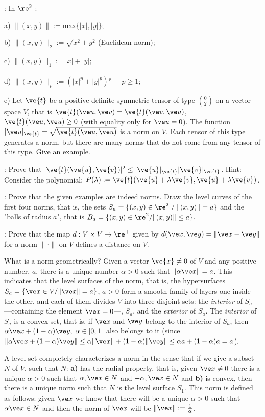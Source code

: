 \noi{}: In $\re^2$ :

\noi a) $\|(x,y)\|:= \text{max}\{|x|,|y|\}$;

\noi b) $\|(x,y)\|_{2}:=\sqrt{x^2+y^2}$ (Euclidean norm);

\noi c) $\|(x,y)\|_{1}:=|x| +|y|$;

\noi d) $\|(x,y)\|_{p}:=(|x|^{p} + |y|^{p})^{\frac{1}{p}} \;\;\;\;\; p\geq 1$;

\noi e) Let $\ve{t}$ be a positive-definite symmetric tensor of type ${0 \choose 2}$ on a vector space $V$, that is 
$\ve{t}(\ve u,\ve v)=\ve{t}(\ve v,\ve u)$, $\ve{t}(\ve u,\ve u)\geq 0$ (with equality only for $\ve u=0$). 
The function $|\ve u|_{\ve{t}} =\sqrt{\ve{t}(\ve u,\ve u)}$ is a norm on $V$. 
Each tensor of this type generates a norm, but there are many norms that do not come from any tensor of 
this type. Give an example.

\ejer: Prove that $|\ve{t}(\ve{u},\ve{v})|^2 \leq |\ve{u}|_{\ve{t}} |\ve{v}|_{\ve{t}}$. 
Hint: Consider the polynomial: $P(\lambda) := \ve{t}(\ve{u} + \lambda \ve{v},\ve{u} + \lambda \ve{v})$.

\ejer: Prove that the given examples are indeed norms. Draw the level curves of the first four norms, that is, 
the sets $S_a=\{(x,y)\in \re^2\;/\; \|(x,y)\|=a\}$ and the "balls of radius $a$", that is $B_a=\{(x,y)\in \re^2/\|(x,y)\|\leq a\}$.

\ejer: Prove that the map $d:V\times V \to \re^+$ given by $d(\ve x,\ve y) = \|\ve x-\ve y\|$ for a norm $\|\cdot\|$ on $V$ defines a distance on $V$.

What is a norm geometrically? Given a vector $\ve{x}\neq 0$ of $V$ and any positive number, $a$, there is a unique number $\alpha > 0$ such that 
$\|\alpha \ve x\|=a$. This indicates that the level surfaces of the norm, that is, the hypersurfaces 
$S_a=\{\ve x\in V / \|\ve x\|=a\}$, $a>0$ form a smooth family of layers one inside the other, and each of them divides $V$ into three disjoint sets: 
the {\it interior} of $S_a$ ---containing the element $\ve x=0$---, $S_a$, and the {\it exterior} of $S_a$. 
The {\it interior} of $S_a$ is a convex set, that is, if $\ve x$ and $\ve y$ belong to the interior of $S_a$, 
then $\alpha \ve x+(1-\alpha)\ve y,\;\alpha\in[0,1]$ also belongs to it (since $\|\alpha \ve x + (1-\alpha )\ve y\| \leq \alpha \|\ve x\| + (1-\alpha )\|\ve y\| \leq \alpha a + (1-\alpha )a = a$).

A level set completely characterizes a norm in the sense that if we give a subset $N$ of $V$, such that $N$: 
\textbf{a)} has the radial property, that is, given $\ve x\neq 0$ there is a unique $\alpha >0$ such that 
$\alpha ,\ve x\in N$ and $-\alpha ,\ve x\in N$ and \textbf{b)} is convex, then there is a unique norm such that 
$N$ is the level surface $S_1$. This norm is defined as follows: given $\ve x$ we know that there will be a unique $\alpha > 0$ 
such that $\alpha \ve x \in N$ and then the norm of $\ve x$ will be $\|\ve x\| := \frac1{\alpha}$.

